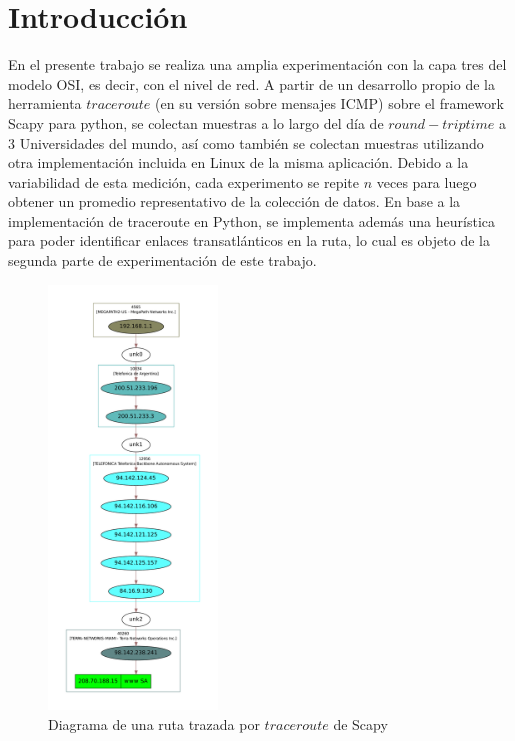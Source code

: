 \section{Introducción}

En el presente trabajo se realiza una amplia experimentación con la capa tres del modelo OSI, es decir, con el nivel de red. A partir de un desarrollo propio de la herramienta $traceroute$ (en su versión sobre mensajes ICMP) sobre el framework Scapy para python, se colectan muestras a lo largo del día de $round-trip time$ a 3 Universidades del mundo, así como también se colectan muestras utilizando otra implementación incluida en Linux de la misma aplicación. Debido a la variabilidad de esta medición, cada experimento se repite $n$ veces para luego obtener un promedio representativo de la colección de datos. En base a la implementación de traceroute en Python, se implementa además una heurística para poder identificar enlaces transatlánticos en la ruta, lo cual es objeto de la segunda parte de experimentación de este trabajo.\\

\begin{figure}[h!]
  \centering
  \includegraphics[width=0.4\textwidth]{./figs/ruta_google.pdf}
  \caption{Diagrama de una ruta trazada por $traceroute$ de Scapy}
\end{figure}
